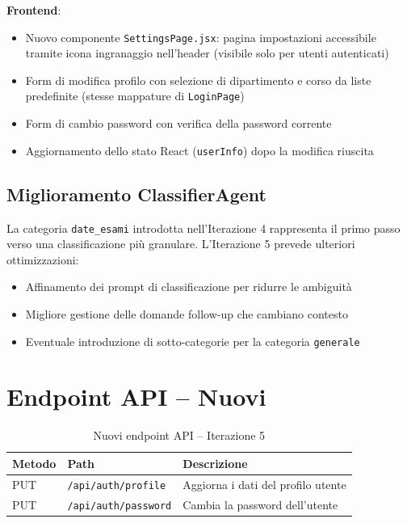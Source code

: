 \documentclass[a4paper,12pt]{report}
\begin{document}
\textbf{Frontend}:
\begin{itemize}
    \item Nuovo componente \texttt{SettingsPage.jsx}: pagina impostazioni accessibile tramite icona ingranaggio nell'header (visibile solo per utenti autenticati)
    \item Form di modifica profilo con selezione di dipartimento e corso da liste predefinite (stesse mappature di \texttt{LoginPage})
    \item Form di cambio password con verifica della password corrente
    \item Aggiornamento dello stato React (\texttt{userInfo}) dopo la modifica riuscita
\end{itemize}

\subsection{Miglioramento ClassifierAgent}

La categoria \texttt{date\_esami} introdotta nell'Iterazione 4 rappresenta il primo passo verso una classificazione più granulare. L'Iterazione 5 prevede ulteriori ottimizzazioni:
\begin{itemize}
    \item Affinamento dei prompt di classificazione per ridurre le ambiguità
    \item Migliore gestione delle domande follow-up che cambiano contesto
    \item Eventuale introduzione di sotto-categorie per la categoria \texttt{generale}
\end{itemize}

\section{Endpoint API -- Nuovi}

\begin{table}[H]
\centering
\begin{tabularx}{\textwidth}{l l X}
\toprule
\textbf{Metodo} & \textbf{Path} & \textbf{Descrizione} \\
\midrule
PUT & \texttt{/api/auth/profile} & Aggiorna i dati del profilo utente \\
PUT & \texttt{/api/auth/password} & Cambia la password dell'utente \\
\bottomrule
\end{tabularx}
\caption{Nuovi endpoint API -- Iterazione 5}
\end{table}
\end{document}
